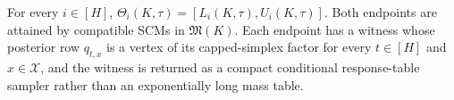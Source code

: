 For every \(i\in[H]\), \(\Theta_i(K,\tau)=[L_i(K,\tau),U_i(K,\tau)]\). Both endpoints are attained by compatible SCMs in \(\mathfrak M(K)\). Each endpoint has a witness whose posterior row \(q_{t,x}\) is a vertex of its capped-simplex factor for every \(t\in[H]\) and \(x\in\mathcal X\), and the witness is returned as a compact conditional response-table sampler rather than an exponentially long mass table.